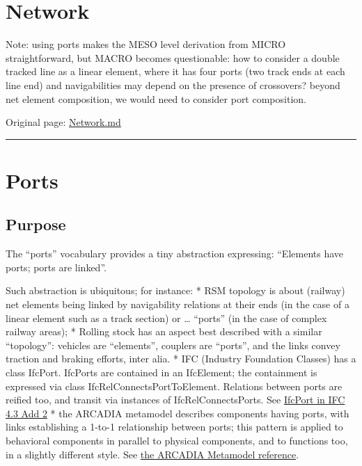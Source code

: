 \documentclass[
  11pt,
]{article}
\begin{document}
\hypertarget{network}{%
\section{Network}\label{network}}

Note: using ports makes the MESO level derivation from MICRO
straightforward, but MACRO becomes questionable: how to consider a
double tracked line as a linear element, where it has four ports (two
track ends at each line end) and navigabilities may depend on the
presence of crossovers? beyond net element composition, we would need to
consider port composition.

Original page:
\href{https://github.com/UICrail/CDM-RSM/wiki/Network}{Network.md}

\begin{center}\rule{0.5\linewidth}{0.5pt}\end{center}

\hypertarget{ports}{%
\section{Ports}\label{ports}}

\hypertarget{purpose-3}{%
\subsection{Purpose}\label{purpose-3}}

The ``ports'' vocabulary provides a tiny abstraction expressing:
``Elements have ports; ports are linked''.

Such abstraction is ubiquitous; for instance: * RSM topology is about
(railway) net elements being linked by navigability relations at their
ends (in the case of a linear element such as a track section) or
\ldots{} ``ports'' (in the case of complex railway areas); * Rolling
stock has an aspect best described with a similar ``topology'': vehicles
are ``elements'', couplers are ``ports'', and the links convey traction
and braking efforts, inter alia. * IFC (Industry Foundation Classes) has
a class IfcPort. IfcPorts are contained in an IfcElement; the
containment is expressed via class IfcRelConnectsPortToElement.
Relations between ports are reified too, and transit via instances of
IfcRelConnectsPorts. See
\href{https://standards.buildingsmart.org/IFC/RELEASE/IFC4_3/HTML/lexical/IfcPort.htm}{IfcPort
in IFC 4.3 Add 2} * the ARCADIA metamodel describes components having
ports, with links establishing a 1-to-1 relationship between ports; this
pattern is applied to behavioral components in parallel to physical
components, and to functions too, in a slightly different style. See
\href{https://mbse-capella.org/resources/arcadia-reference/Arcadia\%20Language\%20-\%20MetaModel.pdf}{the
ARCADIA Metamodel reference}.
\end{document}
